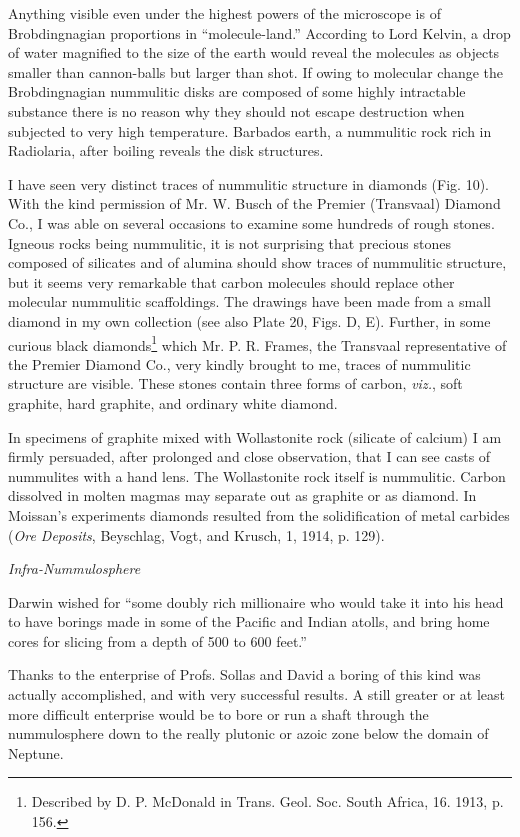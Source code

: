 \documentclass[a4paper, 12pt, oneside]{article}
\begin{document}
Anything visible even under the highest powers of the microscope is of Brobdingnagian proportions in ``molecule-land.'' According to Lord Kelvin, a drop of water magnified to the size of the earth would reveal the molecules as objects smaller than cannon-balls but larger than shot. If owing to molecular change the Brobdingnagian nummulitic disks are composed of some highly intractable substance there is no reason why they should not escape destruction when subjected to very high temperature. Barbados earth, a nummulitic rock rich in Radiolaria, after boiling reveals the disk structures.

I have seen very distinct traces of nummulitic structure in diamonds (Fig. 10). With the kind permission of Mr. W. Busch of the Premier (Transvaal) Diamond Co., I was able on several occasions to examine some hundreds of rough stones. Igneous rocks being nummulitic, it is not surprising that precious stones composed of silicates and of alumina should show traces of nummulitic structure, but it seems very remarkable that carbon molecules should replace other molecular nummulitic scaffoldings. The drawings have been made from a small diamond in my own collection (see also Plate 20, Figs. D, E). Further, in some curious black diamonds\footnote{Described by D. P. McDonald in Trans. Geol. Soc. South Africa, 16. 1913, p. 156.} which Mr. P. R. Frames, the Transvaal representative of the Premier Diamond Co., very kindly brought to me, traces of nummulitic structure are visible. These stones contain three forms of carbon, \emph{viz.}, soft graphite, hard graphite, and ordinary white diamond.

In specimens of graphite mixed with Wollastonite rock (silicate of calcium) I am firmly persuaded, after prolonged and close observation, that I can see casts of nummulites with a hand lens. The Wollastonite rock itself is nummulitic. Carbon dissolved in molten magmas may separate out as graphite or as diamond. In Moissan's experiments diamonds resulted from the solidification of metal carbides (\emph{Ore Deposits}, Beyschlag, Vogt, and Krusch, 1, 1914, p. 129).

\centerline{\emph{Infra-Nummulosphere}}

Darwin wished for ``some doubly rich millionaire who would take it into his head to have borings made in some of the Pacific and Indian atolls, and bring home cores for slicing from a depth of 500 to 600 feet.''

Thanks to the enterprise of Profs. Sollas and David a boring of this kind was actually accomplished, and with very successful results. A still greater or at least more difficult enterprise would be to bore or run a shaft through the nummulosphere down to the really plutonic or azoic zone below the domain of Neptune.
\end{document}
